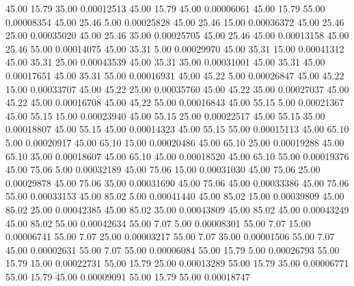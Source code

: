      45.00     15.79     35.00     0.00012513
     45.00     15.79     45.00     0.00006061
     45.00     15.79     55.00     0.00008354
     45.00     25.46      5.00     0.00025828
     45.00     25.46     15.00     0.00036372
     45.00     25.46     25.00     0.00035020
     45.00     25.46     35.00     0.00025705
     45.00     25.46     45.00     0.00013158
     45.00     25.46     55.00     0.00014075
     45.00     35.31      5.00     0.00029970
     45.00     35.31     15.00     0.00041312
     45.00     35.31     25.00     0.00043539
     45.00     35.31     35.00     0.00031001
     45.00     35.31     45.00     0.00017651
     45.00     35.31     55.00     0.00016931
     45.00     45.22      5.00     0.00026847
     45.00     45.22     15.00     0.00033707
     45.00     45.22     25.00     0.00035760
     45.00     45.22     35.00     0.00027037
     45.00     45.22     45.00     0.00016708
     45.00     45.22     55.00     0.00016843
     45.00     55.15      5.00     0.00021367
     45.00     55.15     15.00     0.00023940
     45.00     55.15     25.00     0.00022517
     45.00     55.15     35.00     0.00018807
     45.00     55.15     45.00     0.00014323
     45.00     55.15     55.00     0.00015113
     45.00     65.10      5.00     0.00020917
     45.00     65.10     15.00     0.00020486
     45.00     65.10     25.00     0.00019288
     45.00     65.10     35.00     0.00018607
     45.00     65.10     45.00     0.00018520
     45.00     65.10     55.00     0.00019376
     45.00     75.06      5.00     0.00032189
     45.00     75.06     15.00     0.00031030
     45.00     75.06     25.00     0.00029878
     45.00     75.06     35.00     0.00031690
     45.00     75.06     45.00     0.00033386
     45.00     75.06     55.00     0.00033153
     45.00     85.02      5.00     0.00041440
     45.00     85.02     15.00     0.00039809
     45.00     85.02     25.00     0.00042385
     45.00     85.02     35.00     0.00043809
     45.00     85.02     45.00     0.00043249
     45.00     85.02     55.00     0.00042634
     55.00      7.07      5.00     0.00008301
     55.00      7.07     15.00     0.00006741
     55.00      7.07     25.00     0.00003217
     55.00      7.07     35.00     0.00001506
     55.00      7.07     45.00     0.00002631
     55.00      7.07     55.00     0.00006084
     55.00     15.79      5.00     0.00026793
     55.00     15.79     15.00     0.00022731
     55.00     15.79     25.00     0.00013289
     55.00     15.79     35.00     0.00006771
     55.00     15.79     45.00     0.00009091
     55.00     15.79     55.00     0.00018747
